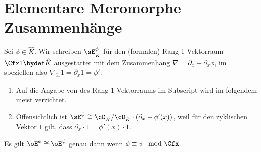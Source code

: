 \chapter{Elementare Meromorphe Zusammenhänge}
\begin{comment}
einführen als Bausteine oder kleinste Meromorphe Zusammenhänge
\end{comment}
\begin{defn}
\cite[1.a]{sabbah_Fourier-local}
Sei $\phi\in\hat K$.
Wir schreiben $\sE_{\hat K}^\phi$ für den (formalen) Rang 1 Vektorraum $\Cfxl
\bydef \hat K$ ausgestattet mit dem Zusammenhang
$\nabla=\partial_x+\partial_x\phi$, im speziellen also
$\nabla_{\partial_x}1=\partial_x1=\phi'$.\\
\begin{comment}
Also
\begin{align*}
\sE^\phi=\Cfxl & \overset{\partial_x}{\rightarrow} \Cfxl\\
1              & \mapsto \phi'(x)\\
f(x)           & \mapsto f'(x)+f(x)\phi'(x)\\
\end{align*}
\end{comment}
\end{defn}
\begin{bem}
\begin{enumerate}
\item Auf die Angabe von des Rang 1 Vektorraums im Subscript wird im folgendem
meist verzichtet.
\item Offensichtlich ist $\sE^\phi\cong\cD_{\hat K}/\cD_{\hat
K}\cdot(\partial_x-\phi'(x))$, weil für den zyklischen Vektor $1$ gilt, dass
$\partial_x \cdot 1 = \phi'(x) \cdot 1$.
\end{enumerate}
\end{bem}

\begin{bem} \label{bem:FormRang1VR}
\cite[1.a]{sabbah_Fourier-local}
Es gilt $\sE^\phi\cong\sE^\psi$ genau dann wenn $\phi\equiv\psi \mod \Cfx$.
\end{bem}

\begin{comment}
ausformulierte version eines beweises im paper sabbah_Fourier-local.pdf zu
lemma 2.4
\end{comment}
\begin{comment}
\begin{lem}[Slope von $\sE^\phi$]
TODO
\end{lem}
\end{comment}

